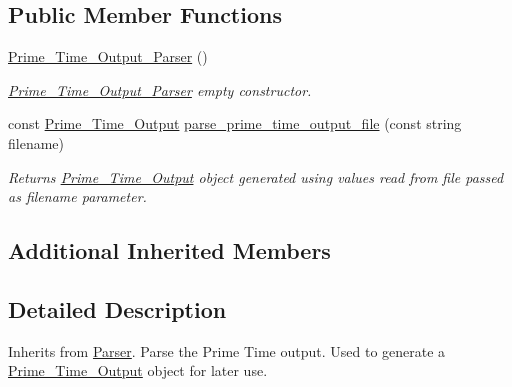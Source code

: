 \subsection*{Public Member Functions}
\begin{DoxyCompactItemize}
\item 
\hypertarget{classPrime__Time__Output__Parser_abbd1008efff182a6b8ce0f676b4ee823}{\hyperlink{classPrime__Time__Output__Parser_abbd1008efff182a6b8ce0f676b4ee823}{Prime\-\_\-\-Time\-\_\-\-Output\-\_\-\-Parser} ()}\label{classPrime__Time__Output__Parser_abbd1008efff182a6b8ce0f676b4ee823}

\begin{DoxyCompactList}\small\item\em \hyperlink{classPrime__Time__Output__Parser}{Prime\-\_\-\-Time\-\_\-\-Output\-\_\-\-Parser} empty constructor. \end{DoxyCompactList}\item 
const \hyperlink{classPrime__Time__Output__Parser_1_1Prime__Time__Output}{Prime\-\_\-\-Time\-\_\-\-Output} \hyperlink{classPrime__Time__Output__Parser_af43de199ba4575214a4d6e07fb980ca5}{parse\-\_\-prime\-\_\-time\-\_\-output\-\_\-file} (const string filename)
\begin{DoxyCompactList}\small\item\em Returns \hyperlink{classPrime__Time__Output__Parser_1_1Prime__Time__Output}{Prime\-\_\-\-Time\-\_\-\-Output} object generated using values read from file passed as filename parameter. \end{DoxyCompactList}\end{DoxyCompactItemize}
\subsection*{Additional Inherited Members}


\subsection{Detailed Description}
Inherits from \hyperlink{classParser}{Parser}. Parse the Prime Time output. Used to generate a \hyperlink{classPrime__Time__Output__Parser_1_1Prime__Time__Output}{Prime\-\_\-\-Time\-\_\-\-Output} object for later use. 

